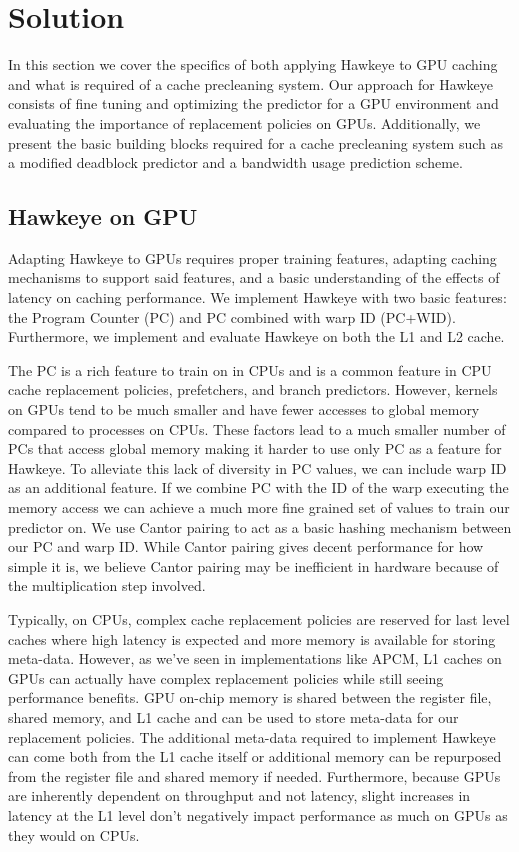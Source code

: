 \chapter{Solution}


In this section we cover the specifics of both applying Hawkeye to GPU caching and what is required of a cache precleaning system. Our approach for Hawkeye consists of fine tuning and optimizing the predictor for a GPU environment and evaluating the importance of replacement policies on GPUs. Additionally, we present the basic building blocks required for a cache precleaning system such as a modified deadblock predictor and a bandwidth usage prediction scheme.

\section{Hawkeye on GPU}
Adapting Hawkeye to GPUs requires proper training features, adapting caching mechanisms to support said features, and a basic understanding of the effects of latency on caching performance. We implement Hawkeye with two basic features: the Program Counter (PC) and PC combined with warp ID (PC+WID). Furthermore, we implement and evaluate Hawkeye on both the L1 and L2 cache.

The PC is a rich feature to train on in CPUs and is a common feature in CPU cache replacement policies, prefetchers, and branch predictors. However, kernels on GPUs tend to be much smaller and have fewer accesses to global memory compared to processes on CPUs. These factors lead to a much smaller number of PCs that access global memory making it harder to use only PC as a feature for Hawkeye. To alleviate this lack of diversity in PC values, we can include warp ID as an additional feature. If we combine PC with the ID of the warp executing the memory access we can achieve a much more fine grained set of values to train our predictor on. We use Cantor pairing to act as a basic hashing mechanism between our PC and warp ID. While Cantor pairing gives decent performance for how simple it is, we believe Cantor pairing may be inefficient in hardware because of the multiplication step involved.

Typically, on CPUs, complex cache replacement policies are reserved for last level caches where high latency is expected and more memory is available for storing meta-data. However, as we’ve seen in implementations like APCM, L1 caches on GPUs can actually have complex replacement policies while still seeing performance benefits. GPU on-chip memory is shared between the register file, shared memory, and L1 cache and can be used to store meta-data for our replacement policies. The additional meta-data required to implement Hawkeye can come both from the L1 cache itself or additional memory can be repurposed from the register file and shared memory if needed. Furthermore, because GPUs are inherently dependent on throughput and not latency, slight increases in latency at the L1 level don’t negatively impact performance as much on GPUs as they would on CPUs.

